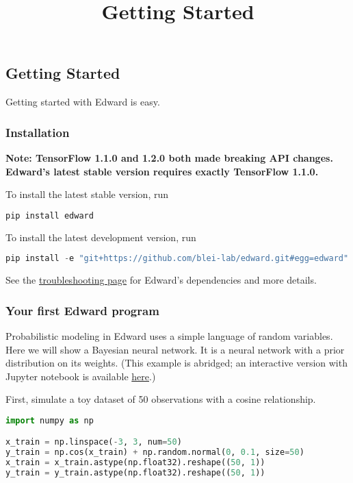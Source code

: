 \title{Getting Started}

\subsection{Getting Started}
Getting started with Edward is easy.

\subsubsection{Installation}

\textbf{Note:
TensorFlow 1.1.0 and 1.2.0 both made breaking API changes.
Edward's latest stable version requires exactly TensorFlow 1.1.0.
}

To install the latest stable version, run

\begin{lstlisting}[language=Java]
pip install edward
\end{lstlisting}

To install the latest development version, run

\begin{lstlisting}[language=Java]
pip install -e "git+https://github.com/blei-lab/edward.git#egg=edward"
\end{lstlisting}

See the \href{/troubleshooting}{troubleshooting page} for
Edward's dependencies and more details.


\subsubsection{Your first Edward program}

Probabilistic modeling in Edward uses a simple language of
random variables.
Here we will show a Bayesian neural network. It is a neural network
with a prior distribution on its weights.
(This example is abridged; an interactive version with Jupyter notebook is available
\href{http://nbviewer.jupyter.org/github/blei-lab/edward/blob/master/notebooks/getting_started.ipynb}{here}.)

First, simulate a toy dataset of 50 observations with a cosine relationship.

\begin{lstlisting}[language=Python]
import numpy as np

x_train = np.linspace(-3, 3, num=50)
y_train = np.cos(x_train) + np.random.normal(0, 0.1, size=50)
x_train = x_train.astype(np.float32).reshape((50, 1))
y_train = y_train.astype(np.float32).reshape((50, 1))
\end{lstlisting}

